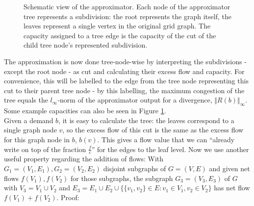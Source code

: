 \begin{figure}
\begin{center}
\end{center}
\caption{Schematic view of the approximator. Each node of the approximator tree represents a subdivision: the root represents the graph itself, the leaves represent a single vertex in the original grid graph. The capacity assigned to a tree edge is the capacity of the cut of the child tree node's represented subdivision.}
\label{ex_approx_structure}
\end{figure}
The approximation is now done tree-node-wise by interpreting the subdivisions - except the root node - as cut and calculating their excess flow and capacity. For convenience, this will be labelled to the edge from the tree node representing this cut to their parent tree node - by this labelling, the maximum congestion of the tree equals the $l_\infty$-norm of the approximator output for a divergence, $\Vert R(b)\Vert_\infty$. Some example capacities can also be seen in Figure \ref{ex_approx_structure}. \\
Given a demand $b$, it is easy to calculate the tree: the leaves correspond to a single graph node $v$, so the excess flow of this cut is the same as the excess flow for this graph node in $b$, $b(v)$. This gives a flow value that we can ``already write on top of the fraction $\frac{f}{c}$'' for the edges to the leaf level. Now we use another useful property regarding the addition of flows: With $G_1=(V_1,E_1),G_2=(V_2,E_2)$ disjoint subgraphs of $G=(V,E)$ and given net flows $f(V_1),f(V_2)$ for those subgraphs, the subgraph $G_3=(V_3,E_3)$ of $G$ with $V_3=V_1\cup V_2$ and $E_3=E_1\cup E_2\cup \{\{v_1,v_2\}\in E:v_1\in V_1,v_2\in V_2\}$ has net flow $f(V_1)+f(V_2)$. Proof:
